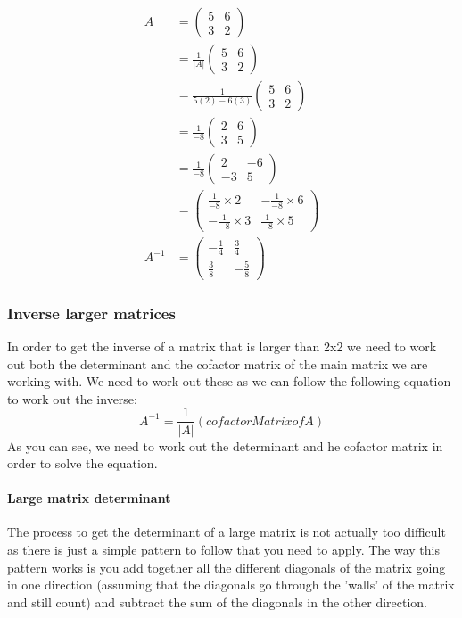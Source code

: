 \documentclass{article}
\begin{document}
\begin{align*}
	A  &=
	\begin{pmatrix}
		5 & 6\\
		3 & 2
	\end{pmatrix}
	\\
	&= \frac{1}{|A|}
	\begin{pmatrix}
		5 & 6\\
		3 & 2
	\end{pmatrix}
	\\
	&= \frac{1}{5(2) - 6(3)}
	\begin{pmatrix}
		5 & 6\\
		3 & 2
	\end{pmatrix}
	\\
	&= \frac{1}{-8}
	\begin{pmatrix}
		2 & 6\\
		3 & 5
	\end{pmatrix}
	\\
	&= \frac{1}{-8}
	\begin{pmatrix}
		2 & -6\\
		-3 & 5
	\end{pmatrix}
	\\
	&=
	\begin{pmatrix}
		\frac{1}{-8}\times2 & -\frac{1}{-8}\times6\\
		-\frac{1}{-8}\times3 & \frac{1}{-8}\times5
	\end{pmatrix}
	\\
	A^{-1}&=
	\begin{pmatrix}
		-\frac{1}{4} & \frac{3}{4}\\
		\frac{3}{8} & -\frac{5}{8}
	\end{pmatrix}
\end{align*}
\subsubsection{Inverse larger matrices}
In order to get the inverse of a matrix that is larger than 2x2 we need to work out both the determinant and the cofactor matrix of the main matrix we are working with. We need to work out these as we can follow the following equation to work out the inverse:
\[
	A^{-1} = \frac{1}{|A|}(cofactor Matrix of A)
\]
As you can see, we need to work out the determinant and he cofactor matrix in order to solve the equation.
\paragraph{Large matrix determinant}
The process to get the determinant of a large matrix is not actually too difficult as there is just a simple pattern to follow that you need to apply. The way this pattern works is you add together all the different diagonals of the matrix going in one direction (assuming that the diagonals go through the 'walls' of the matrix and still count) and subtract the sum of the diagonals in the other direction. 
\end{document}
